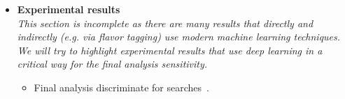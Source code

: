 \documentclass[12pt,letterpaper]{article}
\begin{document}
\begin{itemize}
\begin{itemize}
	\end{itemize}
\item \textbf{Experimental results}
\\\textit{This section is incomplete as there are many results that directly and indirectly (e.g. via flavor tagging) use modern machine learning techniques.  We will try to highlight experimental results that use deep learning in a critical way for the final analysis sensitivity.}
	\begin{itemize}
		\item Final analysis discriminate for searches~\cite{Aad:2019yxi,Aad:2020hzm,collaboration2020dijet,Sirunyan:2020hwz}.
	\end{itemize}


\end{itemize}


\clearpage
\flushbottom
%


\end{document}
